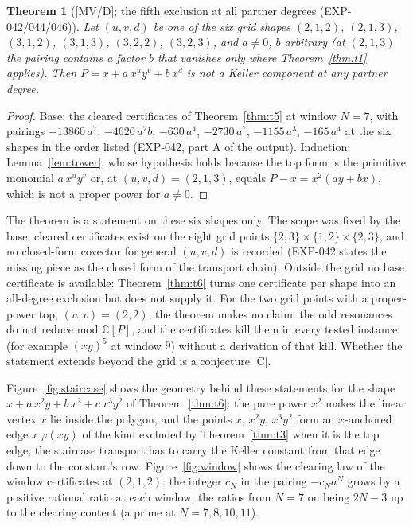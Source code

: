 \documentclass[11pt]{article}
\newtheorem{theorem}{Theorem}[section]
\theoremstyle{remark}
\newcommand{\C}{\mathbb{C}}
\begin{document}
\begin{theorem}[{[MV/D]}; the fifth exclusion at all partner degrees (EXP-042/044/046)]
\label{thm:t5all}
Let $(u,v,d)$ be one of the six grid shapes $(2,1,2)$, $(2,1,3)$, $(3,1,2)$, $(3,1,3)$, $(3,2,2)$, $(3,2,3)$,
and $a\ne0$, $b$ arbitrary (at $(2,1,3)$ the pairing contains a factor $b$ that vanishes only where
Theorem~\ref{thm:t1} applies). Then $P = x + a\,x^u y^v + b\,x^d$ is not a Keller component at \emph{any} partner
degree.
\end{theorem}

\begin{proof}
Base: the cleared certificates of Theorem~\ref{thm:t5} at window $N=7$, with pairings
$-13860\,a^7$, $-4620\,a^7b$, $-630\,a^4$, $-2730\,a^7$, $-1155\,a^3$, $-165\,a^4$ at the six shapes in the order listed
(EXP-042, part A of the output). Induction: Lemma~\ref{lem:tower}, whose hypothesis holds because the top form is the primitive
monomial $a\,x^uy^v$ or, at $(u,v,d)=(2,1,3)$, equals $P-x=x^2(ay+bx)$, which is not a proper power for $a\ne0$.
\end{proof}

The theorem is a statement on these six shapes only. The scope was fixed by the base: cleared certificates exist on the
eight grid points $\{2,3\}\times\{1,2\}\times\{2,3\}$, and no closed-form covector for general $(u,v,d)$ is recorded
(EXP-042 states the missing piece as the closed form of the transport chain). Outside the grid no base certificate is
available: Theorem~\ref{thm:t6} turns one certificate per shape into an all-degree exclusion but does not supply it. For the
two grid points with a proper-power top, $(u,v)=(2,2)$, the theorem makes no claim: the odd resonances do not reduce mod
$\C[P]$, and the certificates kill them in every tested instance (for example $(xy)^5$ at window $9$) without a derivation of
that kill. Whether the statement extends beyond the grid is a conjecture [C].

Figure~\ref{fig:staircase} shows the geometry behind these statements for the shape
$x+a\,x^2y+b\,x^2+c\,x^3y^2$ of Theorem~\ref{thm:t6}: the pure power $x^2$ makes the linear vertex $x$ lie inside the
polygon, and the points $x$, $x^2y$, $x^3y^2$ form an $x$-anchored edge $x\,\varphi(xy)$ of the kind excluded by Theorem~\ref{thm:t3} when
it is the top edge; the staircase transport has to carry the Keller constant from that edge down to the constant's row. Figure~\ref{fig:window}
shows the clearing law of the window certificates at $(2,1,2)$: the integer $c_N$ in the pairing $-c_Na^N$ grows by a positive rational ratio at each window,
the ratios from $N=7$ on being $2N-3$ up to the clearing content (a prime at $N=7,8,10,11$).
\end{document}
